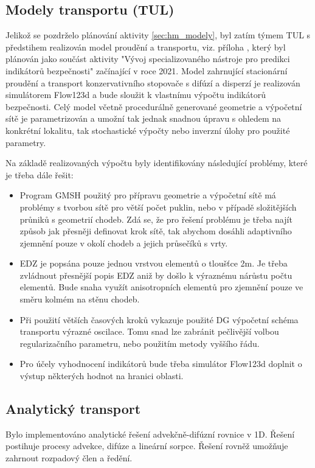 \documentclass[11pt,a4paper]{article}
\begin{document}
\begin{onehalfspacing}
\section{Modely transportu (TUL)}
\label{sec:transport}

Jelikož se pozdrželo plánování aktivity \ref{sec:hm_modely}, byl zatím týmem TUL s předstihem realizován model proudění a transportu, 
viz. příloha , který byl plánován jako součást aktivity "Vývoj specializovaného nástroje pro predikci indikátorů bezpečnosti" začínající v roce 2021. Model zahrnující stacionární proudění a transport konzervativního stopovače s difúzí a disperzí je realizován simulátorem Flow123d a bude sloužit k vlastnímu výpočtu indikátorů bezpečnosti. Celý model včetně procedurálně generované geometrie a výpočetní sítě je parametrizován a umožní tak jednak snadnou úpravu s ohledem na konkrétní 
lokalitu, tak stochastické výpočty nebo inverzní úlohy pro použité parametry.

Na základě realizovaných výpočtu byly identifikovány následující problémy, které je třeba dále řešit:
\begin{itemize}
    \item Program GMSH použitý pro přípravu geometrie a výpočetní sítě má problémy s tvorbou sítě pro větší počet puklin, nebo v případě složitějších průniků s geometrií chodeb. Zdá se, že pro řešení problému je třeba najít způsob jak přesněji definovat 
    krok sítě, tak abychom dosáhli adaptivního zjemnění pouze v okolí chodeb a jejich průsečíků s vrty.
    \item EDZ je popsána pouze jednou vrstvou elementů o tloušťce 2m. Je třeba zvládnout přesnější popis EDZ aniž by došlo k výraznému nárůstu počtu elementů. Bude snaha využít anisotropních elementů pro zjemnění pouze ve směru kolmém na stěnu chodeb.
    \item Při použití větších časových kroků vykazuje použité DG výpočetní schéma transportu výrazné oscilace. Tomu snad lze zabránit
    pečlivější volbou regularizačního parametru, nebo použitím metody vyššího řádu.
    \item Pro účely vyhodnocení indikátorů bude třeba simulátor Flow123d doplnit o výstup některých hodnot na hranici oblasti.
\end{itemize}

\subsection{Analytický transport}
Bylo implementováno analytické řešení advekčně-difúzní rovnice v 1D.  
Řešení postihuje procesy advekce, difúze a lineární sorpce. Řešení rovněž umožňuje zahrnout rozpadový člen a ředění.


\end{onehalfspacing}
\end{document}
